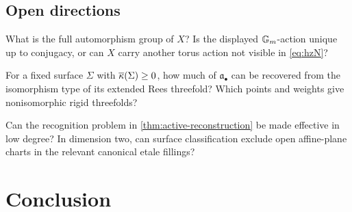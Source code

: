 \subsection{Open directions}

\begin{question}\label{q:automorphisms}
What is the full automorphism group of $X$?  Is the displayed $\mathbb G_m$-action unique up to conjugacy, or can $X$ carry another torus action not visible in \eqref{eq:hzN}?
\end{question}

\begin{question}\label{q:recover-filtration}
For a fixed surface $\Sigma$ with $\overline\kappa(\Sigma)\geq0$, how much of $\mathfrak a_\bullet$ can be recovered from the isomorphism type of its extended Rees threefold?  Which points and weights give nonisomorphic rigid threefolds?
\end{question}

\begin{question}\label{q:active-recognition}
Can the recognition problem in \cref{thm:active-reconstruction} be made effective in low degree?  In dimension two, can surface classification exclude open affine-plane charts in the relevant canonical etale fillings?
\end{question}

\section{Conclusion}\label{sec:conclusion}

